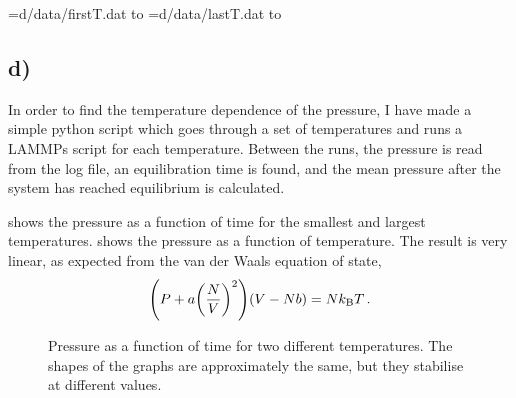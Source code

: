 \documentclass[11pt,british,a4paper]{report}
\begin{document}
%
\openin\infile=d/data/firstT.dat
\read\infile to \firstT
\closein\infile
\openin\infile=d/data/lastT.dat
\read\infile to \lastT
\closein\infile
\subsection*{d)}
In order to find the temperature dependence of the pressure, I have made a simple python script which goes through a set of temperatures and runs a LAMMPs script for each temperature.
Between the runs, the pressure is read from the log file, an equilibration time is found, and the mean pressure after the system has reached equilibrium is calculated.

 shows the pressure as a function of time for the smallest and largest temperatures.
 shows the pressure as a function of temperature. The result is very linear, as expected from the van der Waals equation of state,
\[
    \qty(P+a\qty(\frac{N}{V})^2)\qty(V-Nb) = Nk_\mathrm{B}T\,.
\]
\begin{figure}[htbp]
    \centering
    \caption{Pressure as a function of time for two different temperatures. The shapes of the graphs are approximately the same, but they stabilise at different values.}
    \label{fig:presstime}
\end{figure}
\end{document}

